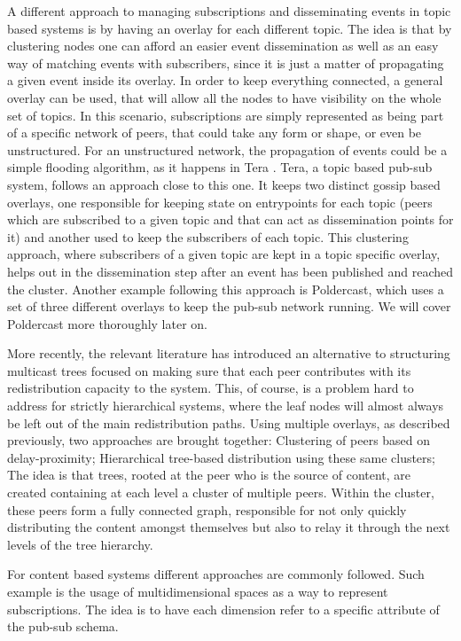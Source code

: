 A different approach to managing subscriptions and disseminating events in
topic based systems is by having an overlay for each different topic.  The idea
is that by clustering nodes one can afford an easier event dissemination as
well as an easy way of matching events with subscribers, since it is just a
matter of propagating a given event inside its overlay. In order to keep
everything connected, a general overlay can be used, that will allow all the
nodes to have visibility on the whole set of topics. In this scenario,
subscriptions are simply represented as being part of a specific network of
peers, that could take any form or shape, or even be unstructured. For an
unstructured network, the propagation of events could be a simple flooding
algorithm, as it happens in Tera \cite{Baldoni2007}. Tera, a topic based
pub-sub system, follows an approach close to this one. It keeps two distinct
gossip based overlays, one responsible for keeping state on entrypoints for
each topic (peers which are subscribed to a given topic and that can act as
dissemination points for it) and another used to keep the subscribers of each
topic. This clustering approach, where subscribers of a given topic are kept in
a topic specific overlay, helps out in the dissemination step after an event
has been published and reached the cluster. Another example following this
approach is Poldercast, which uses a set of three different overlays to keep
the pub-sub network running. We will cover Poldercast more thoroughly later on.

More recently, the relevant literature has introduced an alternative to
structuring multicast trees \cite{Hasimoto-Beltran2019} focused on making sure
that each peer contributes with its redistribution capacity to the system.
This, of course, is a problem hard to address for strictly hierarchical
systems, where the leaf nodes will almost always be left out of the main
redistribution paths. Using multiple overlays, as described previously, two
approaches are brought together: Clustering of peers based on delay-proximity;
Hierarchical tree-based distribution using these same clusters; The idea is
that trees, rooted at the peer who is the source of content, are created
containing at each level a cluster of multiple peers. Within the cluster, these
peers form a fully connected graph, responsible for not only quickly
distributing the content amongst themselves but also to relay it through the
next levels of the tree hierarchy.

For content based systems different approaches are commonly followed. Such
example is the usage of multidimensional spaces as a way to represent
subscriptions. The idea is to have each dimension refer to a specific attribute
of the pub-sub schema.

